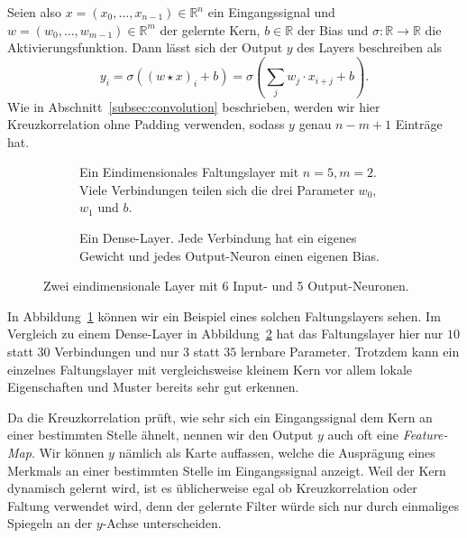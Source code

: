 \documentclass[paper=a4, 	%
		fontsize=11pt,
		abstract=true, 	%
		headsepline, 	%
		notitlepage	%
		]{scrartcl}
\theoremstyle{definition}
\newcommand{\R}{\mathbb{R}}
\begin{document}
Seien also $x=(x_0,\dots,x_{n-1})\in\R^n$ ein Eingangssignal und $w=(w_0,\dots,w_{m-1})\in\R^m$ der gelernte Kern, $b\in\R$ der Bias und $\sigma: \R\rightarrow\R$ die Aktivierungsfunktion.
Dann lässt sich der Output $y$ des Layers beschreiben als
\[
    y_i = \sigma\left( (w \star x)_i + b  \right)
    = \sigma\left( \sum_j w_j \cdot x_{i+j} + b \right).
\]
Wie in Abschnitt~\ref{subsec:convolution} beschrieben, werden wir hier Kreuzkorrelation ohne Padding verwenden, sodass $y$ genau ${n-m+1}$ Einträge hat.


\begin{figure}
\begin{subfigure}{0.48\textwidth}
    \centering
    
    \caption{Ein Eindimensionales Faltungslayer mit $n=5,m=2$.
    Viele Verbindungen teilen sich die drei Parameter $w_0$, $w_1$ und $b$.
    }
    \label{fig:one-dimensional-conv-layer}
\end{subfigure}\hfill
\begin{subfigure}{0.48\textwidth}
    \centering
    \vspace{0.2cm}
    
    \caption{Ein Dense-Layer. Jede Verbindung hat ein eigenes Gewicht und jedes Output-Neuron einen eigenen Bias.}
    \label{fig:one-dimensional-dense-layer}
\end{subfigure}
    \caption{Zwei eindimensionale Layer mit 6 Input- und 5 Output-Neuronen.}
    \label{fig:one-dimensional-layers}
\end{figure}

In Abbildung~\ref{fig:one-dimensional-conv-layer} können wir ein Beispiel eines solchen Faltungslayers sehen.
Im Vergleich zu einem Dense-Layer in Abbildung~\ref{fig:one-dimensional-dense-layer} hat das Faltungslayer hier nur $10$ statt $30$ Verbindungen und nur $3$ statt $35$ lernbare Parameter.
Trotzdem kann ein einzelnes Faltungslayer mit vergleichsweise kleinem Kern vor allem lokale Eigenschaften und Muster bereits sehr gut erkennen.

Da die Kreuzkorrelation prüft, wie sehr sich ein Eingangssignal dem Kern an einer bestimmten Stelle ähnelt, nennen wir den Output $y$ auch oft eine \emph{Feature-Map}.
Wir können $y$ nämlich als Karte auffassen, welche die Ausprägung eines Merkmals an einer bestimmten Stelle im Eingangssignal anzeigt.
Weil der Kern dynamisch gelernt wird, ist es üblicherweise egal ob Kreuzkorrelation oder Faltung verwendet wird, denn der gelernte Filter würde sich nur durch einmaliges Spiegeln an der $y$-Achse unterscheiden.
\end{document}
